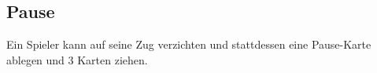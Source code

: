 \subsection{Pause}

Ein Spieler kann auf seine Zug verzichten und stattdessen eine Pause-Karte ablegen und 3 Karten
ziehen.